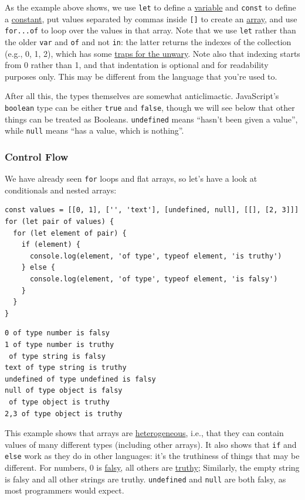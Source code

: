 As the example above shows, we use \texttt{let} to define a
\protect\hyperlink{g:variable}{variable} and \texttt{const} to define a
\protect\hyperlink{g:constant}{constant}, put values separated by commas
inside \texttt{{[}{]}} to create an \protect\hyperlink{g:array}{array},
and use \texttt{for...of} to loop over the values in that array. Note
that we use \texttt{let} rather than the older \texttt{var} and
\texttt{of} and not \texttt{in}: the latter returns the indexes of the
collection (e.g., 0, 1, 2), which has some
\protect\hyperlink{s:legacy-iteration}{traps for the unwary}. Note also
that indexing starts from 0 rather than 1, and that indentation is
optional and for readability purposes only. This may be different from
the language that you're used to.

After all this, the types themselves are somewhat anticlimactic.
JavaScript's \texttt{boolean} type can be either \texttt{true} and
\texttt{false}, though we will see below that other things can be
treated as Booleans. \texttt{undefined} means ``hasn't been given a
value'', while \texttt{null} means ``has a value, which is nothing''.

\subsubsection{Control Flow}\label{s:basics-control-flow}

We have already seen \texttt{for} loops and flat arrays, so let's have a
look at conditionals and nested arrays:

\begin{verbatim}
const values = [[0, 1], ['', 'text'], [undefined, null], [[], [2, 3]]]
for (let pair of values) {
  for (let element of pair) {
    if (element) {
      console.log(element, 'of type', typeof element, 'is truthy')
    } else {
      console.log(element, 'of type', typeof element, 'is falsy')
    }
  }
}
\end{verbatim}

\begin{verbatim}
0 of type number is falsy
1 of type number is truthy
 of type string is falsy
text of type string is truthy
undefined of type undefined is falsy
null of type object is falsy
 of type object is truthy
2,3 of type object is truthy
\end{verbatim}

This example shows that arrays are
\protect\hyperlink{g:heterogeneous}{heterogeneous}, i.e., that they can
contain values of many different types (including other arrays). It also
shows that \texttt{if} and \texttt{else} work as they do in other
languages: it's the truthiness of things that may be different. For
numbers, 0 is \protect\hyperlink{g:falsy}{falsy}, all others are
\protect\hyperlink{g:truthy}{truthy}; Similarly, the empty string is
falsy and all other strings are truthy. \texttt{undefined} and
\texttt{null} are both falsy, as most programmers would expect.

